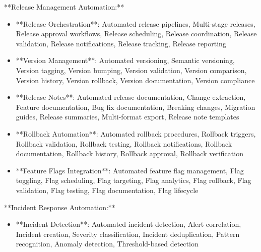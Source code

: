 \documentclass[11pt,a4paper]{article}
\begin{document}
**Release Management Automation:**

\begin{itemize}
\item **Release Orchestration**: Automated release pipelines, Multi-stage releases, Release approval workflows, Release scheduling, Release coordination, Release validation, Release notifications, Release tracking, Release reporting
\end{itemize}

\begin{itemize}
\item **Version Management**: Automated versioning, Semantic versioning, Version tagging, Version bumping, Version validation, Version comparison, Version history, Version rollback, Version documentation, Version compliance
\end{itemize}

\begin{itemize}
\item **Release Notes**: Automated release documentation, Change extraction, Feature documentation, Bug fix documentation, Breaking changes, Migration guides, Release summaries, Multi-format export, Release note templates
\end{itemize}

\begin{itemize}
\item **Rollback Automation**: Automated rollback procedures, Rollback triggers, Rollback validation, Rollback testing, Rollback notifications, Rollback documentation, Rollback history, Rollback approval, Rollback verification
\end{itemize}

\begin{itemize}
\item **Feature Flags Integration**: Automated feature flag management, Flag toggling, Flag scheduling, Flag targeting, Flag analytics, Flag rollback, Flag validation, Flag testing, Flag documentation, Flag lifecycle
\end{itemize}

**Incident Response Automation:**

\begin{itemize}
\item **Incident Detection**: Automated incident detection, Alert correlation, Incident creation, Severity classification, Incident deduplication, Pattern recognition, Anomaly detection, Threshold-based detection
\end{itemize}
\end{document}
